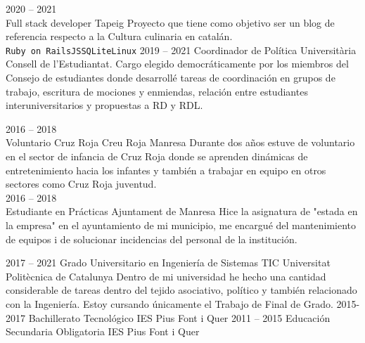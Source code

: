 \documentclass[9pt]{developercv} %
\begin{document}
\begin{entrylist}
    \entry
		{2020 -- 2021\\}
		{Full stack developer}
		{Tapeig}
		{Proyecto que tiene como objetivo ser un blog de referencia respecto a la Cultura culinaria en catalán.\\ \texttt{Ruby on Rails}\slashsep\texttt{JS}\slashsep\texttt{SQLite}\slashsep\texttt{Linux}}
	\entry
		{2019 -- 2021}
		{Coordinador de Política Universitària}
		{Consell de l'Estudiantat.}
		{ Cargo elegido democráticamente por los miembros del Consejo de estudiantes donde desarrollé tareas de coordinación en grupos de trabajo, escritura de mociones y enmiendas, relación entre estudiantes interuniversitarios y propuestas a RD y RDL.
		\\ }
	
	\entry
		{2016 -- 2018\\}
		{Voluntario Cruz Roja}
		{Creu Roja Manresa}
		{Durante dos años estuve de voluntario en el sector de infancia de Cruz Roja donde se aprenden dinámicas de entretenimiento hacia los infantes y también a trabajar en equipo en otros sectores como Cruz Roja juventud. \\ }
	\entry
		{2016 -- 2018\\}
		{Estudiante en Prácticas}
		{Ajuntament de Manresa}
		{Hice la asignatura de "estada en la empresa" en el ayuntamiento de mi municipio, me encargué del mantenimiento de equipos i de solucionar incidencias del personal de la institución. }
\end{entrylist}



\begin{entrylist}
	\entry
		{2017 -- 2021}
		{Grado Universitario en Ingeniería de Sistemas TIC}
		{Universitat Politècnica de Catalunya}
		{Dentro de mi universidad he hecho una cantidad considerable de tareas dentro del tejido asociativo, político y también relacionado con la Ingeniería. Estoy cursando únicamente el Trabajo de Final de Grado.}
	\entry
		{2015-2017}
		{Bachillerato Tecnológico}
		{IES Pius Font i Quer}
		{}
	\entry
		{2011 -- 2015}
		{Educación Secundaria Obligatoria}
		{IES Pius Font i Quer}
		{}
\end{entrylist}

\end{document}
